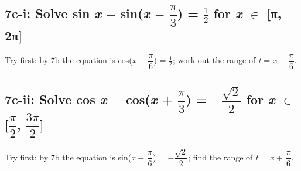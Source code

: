 \documentclass[11pt]{article}
\begin{document}
\begin{keepsection}
\begin{keepsection}
\subsection{7c-i: Solve sin \textit{x} \ensuremath{-} sin(\textit{x} \ensuremath{-} {\small\ensuremath{\dfrac{π}{3}}}) = \ensuremath{\tfrac12} for \textit{x} \ensuremath{\in} [π, 2π]}

Try first: by 7b the equation is cos(\textit{x} \ensuremath{-} {\small\ensuremath{\dfrac{π}{6}}}) = \ensuremath{\tfrac12}; work out the range of \textit{t} = \textit{x} \ensuremath{-} {\small\ensuremath{\dfrac{π}{6}}}.

\end{keepsection}

\begin{keepsection}
\subsection{7c-ii: Solve cos \textit{x} \ensuremath{-} cos(\textit{x} + {\small\ensuremath{\dfrac{π}{3}}}) = \ensuremath{-}{\small\ensuremath{\dfrac{\sqrt{2}}{2}}} for \textit{x} \ensuremath{\in} [{\small\ensuremath{\dfrac{π}{2}}}, {\small\ensuremath{\dfrac{3π}{2}}}]}

Try first: by 7b the equation is sin(\textit{x} + {\small\ensuremath{\dfrac{π}{6}}}) = \ensuremath{-}{\small\ensuremath{\dfrac{\sqrt{2}}{2}}}; find the range of \textit{t} = \textit{x} + {\small\ensuremath{\dfrac{π}{6}}}.

\end{keepsection}
\end{keepsection}
\end{document}
